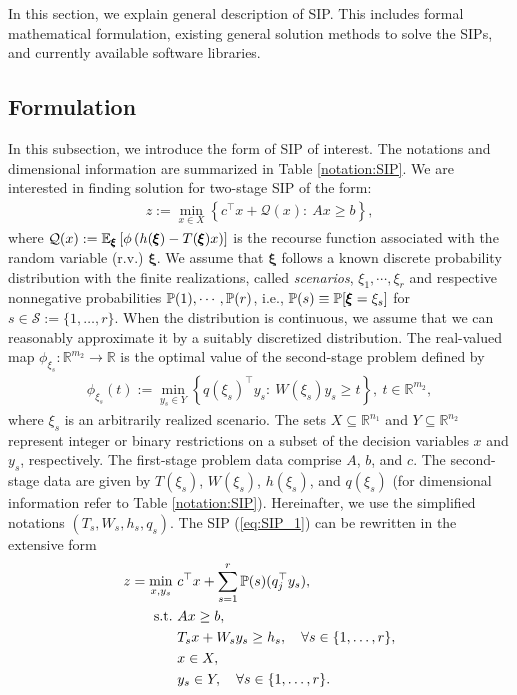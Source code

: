 In this section, we explain general description of SIP. This includes formal mathematical formulation, existing general solution methods to solve the SIPs, and currently available software libraries.
\subsection{Formulation}
In this subsection, we introduce the form of SIP of interest. The notations and dimensional information are summarized in Table \ref{notation:SIP}. We are interested in finding solution for two-stage SIP of the form: 
\begin{align}
z:=\min_{x\in X}{\left\{c^\top x + \mathcal{Q}(x):\ Ax\ge b\right\}}, \label{eq:SIP_1}
\end{align}
where $\mathcal{Q}(x):=\operatorname*{\mathbb{E}}_{\pmb{\xi}}\left[ \phi\left( h(\pmb{\xi})-T(\pmb{\xi})x \right) \right]$ is the recourse function associated with the random variable (r.v.) $\pmb{\xi}$. We assume that $\pmb{\xi}$ follows a known discrete probability distribution with the finite realizations, called \textit{scenarios}, $\xi_1,\cdots,\xi_r$ and respective nonnegative probabilities $\operatorname*{\mathbb{P}}(1),\cdots,\operatorname*{\mathbb{P}}(r)$, i.e., $\operatorname*{\mathbb{P}}(s)\equiv\operatorname*{\mathbb{P}}[\pmb{\xi}=\xi_s]$ for $s\in\mathcal{S}:=\{1,\ldots,r\}$. When the distribution is continuous, we assume that we can reasonably approximate it by a suitably discretized distribution. The real-valued map $\phi_{\xi_s}:\mathbb{R}^{m_2}\to\mathbb{R}$ is the optimal value of the second-stage problem defined by
\begin{align}
\phi_{\xi_s}(t):=\min_{y_s\in Y}\left\{ q(\xi_s)^\top y_s:\ W(\xi_s)y_s \ge t \right\},\ t\in\mathbb{R}^{m_2},
\end{align}
where $\xi_s$ is an arbitrarily realized scenario.
The sets $X\subseteq \mathbb{R}^{n_1}$ and $Y\subseteq\mathbb{R}^{n_2}$ represent integer or binary restrictions on a subset of the decision variables $x$ and $y_s$, respectively. 
The first-stage problem data comprise $A$, $b$, and $c$. The second-stage data are given by $T(\xi_s)$, $W(\xi_s)$, $h(\xi_s)$, and $q(\xi_s)$ (for dimensional information refer to Table \ref{notation:SIP}). Hereinafter, we use the simplified notations $(T_s,W_s,h_s,q_s)$.
The SIP (\ref{eq:SIP_1}) can be rewritten in the extensive form
\begin{subequations}\label{sip:ef}
\begin{align}
z=\min_{x,y_s}\ &c^{\top}x + \sum_{s=1}^{r}\operatorname*{\mathbb{P}}(s) (q_j^{\top}y_s), \\ 
\mathrm{s.t.}\ &Ax\ge b,  \\
	&T_s x+W_s y_s\ge h_s,\quad\forall s\in\{1,\ldots,r\},\\
	&x\in X, \\
	&y_s \in Y,\quad\forall s\in\{1,\ldots,r\}.
\end{align}
\end{subequations}

